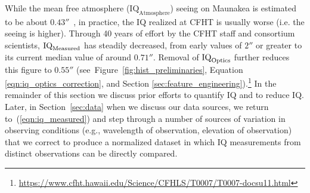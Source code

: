 While the mean free atmosphere ($\textrm{IQ}_{\textrm{Atmosphere}}$) seeing on Maunakea is estimated to be about $0.43''$~\citep{salmon2009cfht}, in practice, the IQ realized at CFHT is usually worse (i.e. the seeing is higher). Through 40 years of effort by the CFHT staff and  consortium scientists,  $\textrm{IQ}_{\textrm{Measured}}$ has steadily decreased, from early values of $2''$ or greater to its current median value of around $0.71''$. Removal of  $\textrm{IQ}_{\textrm{Optics}}$ further reduces this figure to $0.55''$ (see~Figure~\ref{fig:hist_preliminaries}, Equation \ref{eqn:iq_optics_correction}, and Section \ref{sec:feature_engineering}).\footnote{\url{https://www.cfht.hawaii.edu/Science/CFHLS/T0007/T0007-docsu11.html}} In the remainder of this section we discuss prior efforts to quantify IQ and to reduce IQ. Later, in Section~\ref{sec:data} when we discuss our data sources, we return to~(\ref{eqn:iq_measured}) and step through a number of sources of variation in observing conditions (e.g., wavelength of observation, elevation of observation) that we correct to produce a normalized dataset in which IQ measurements from distinct observations can be directly compared.

\iffalse
\begin{figure*}


\centering
\texttt{[image: figures/mkam\_seeing\_distribution.pdf]}
\caption{Distribution of seeing measured by the Multiple Aperture Scintillation Sensor (MASS) atmospheric profile, the MKAM Differential Image Motion Monitor (DIMM) and IQ effectively measured at MegaPrime since 2010.}
\label{fig:hist_preliminaries}
\end{figure*}

\fi


